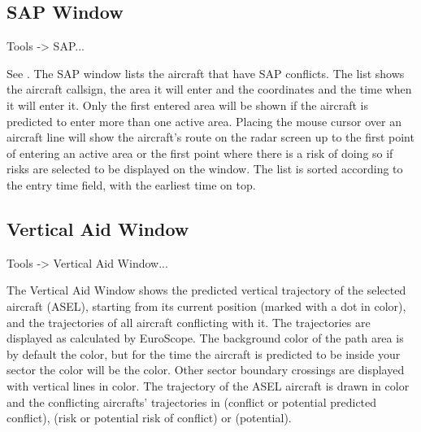 \documentclass[a4paper,oneside,11pt]{memoir}
\begin{document}
\subsection{SAP Window}
\label{win:sap}

 Tools -> SAP...

\bigskip


See . The SAP window lists the aircraft that have SAP conflicts. The list shows the aircraft callsign, the area it will enter and the coordinates and the time when it will enter it. Only the first entered area will be shown if the aircraft is predicted to enter more than one active area. Placing the mouse cursor over an aircraft line will show the aircraft’s route on the radar screen up to the first point of entering an active area or the first point where there is a risk of doing so if risks are selected to be displayed on the window. The list is sorted according to the entry time field, with the earliest time on top.

\subsection{Vertical Aid Window}
\label{win:vaw}

 Tools -> Vertical Aid Window...

\bigskip


The Vertical Aid Window shows the predicted vertical trajectory of the selected aircraft (ASEL), starting from its current position (marked with a dot in  color), and the trajectories of all aircraft conflicting with it. The trajectories are displayed as calculated by EuroScope. The background color of the path area is by default the  color, but for the time the aircraft is predicted to be inside your sector the color will be the  color. Other sector boundary crossings are displayed with vertical lines in  color. The trajectory of the ASEL aircraft is drawn in  color and the conflicting aircrafts’ trajectories in  (conflict or potential predicted conflict),  (risk or potential risk of conflict) or  (potential).

\bigskip
\end{document}
